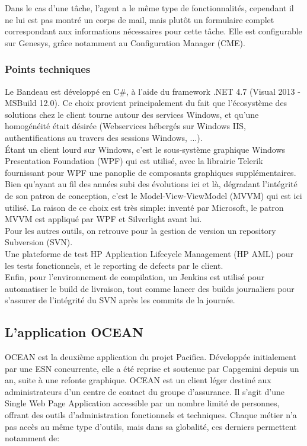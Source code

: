 \documentclass{rapport}
\begin{document}
Dans le cas d'une tâche, l'agent a le même type de fonctionnalités, cependant il ne lui est pas montré un corps de mail, mais plutôt un formulaire complet correspondant aux informations nécessaires pour cette tâche. Elle est configurable sur Genesys, grâce notamment au Configuration Manager (CME).

\subsubsection{Points techniques}

Le Bandeau est développé en C\#, à l'aide du framework .NET 4.7 (Visual 2013 - MSBuild 12.0). Ce choix provient principalement du fait que l'écosystème des solutions chez le client tourne autour des services Windows, et qu'une homogénéité était désirée (Webservices hébergés sur Windows IIS, authentifications au travers des sessions Windows, ...).\\
Étant un client lourd sur Windows, c'est le sous-système graphique Windows Presentation Foundation (WPF) qui est utilisé, avec la librairie Telerik fournissant pour WPF une panoplie de composants graphiques supplémentaires.\\

Bien qu'ayant au fil des années subi des évolutions ici et là, dégradant l'intégrité de son patron de conception, c'est le Model-View-ViewModel (MVVM) qui est ici utilisé. La raison de ce choix est très simple: inventé par Microsoft, le patron MVVM est appliqué par WPF et Silverlight avant lui.\\

Pour les autres outils, on retrouve pour la gestion de version un repository Subversion (SVN).\\
Une plateforme de test HP Application Lifecycle Management (HP AML) pour les tests fonctionnels, et le reporting de defects par le client.\\
Enfin, pour l'environnement de compilation, un Jenkins est utilisé pour automatiser le build de livraison, tout comme lancer des builds journaliers pour s'assurer de l'intégrité du SVN après les commits de la journée.

\subsection{L'application OCEAN}

OCEAN est la deuxième application du projet Pacifica. Développée initialement par une ESN concurrente, elle a été reprise et soutenue par Capgemini depuis un an, suite à une refonte graphique. OCEAN est un client léger destiné aux administrateurs d'un centre de contact du groupe d'assurance. Il s'agit d'une Single Web Page Application accessible par un nombre limité de personnes, offrant des outils d'administration fonctionnels et techniques. Chaque métier n'a pas accès au même type d'outils, mais dans sa globalité, ces derniers permettent notamment de:\\
\end{document}
